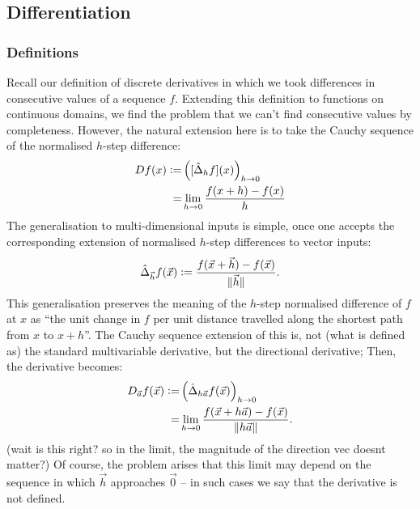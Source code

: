 \documentclass{article}
\theoremstyle{definition}
\begin{document}
\subsection{Differentiation}
\subsubsection{Definitions}
Recall our definition of discrete derivatives in which we took differences in consecutive values of a sequence $f$. Extending this definition to functions on continuous domains, we find the problem that we can't find consecutive values by completeness. However, the natural extension here is to take the Cauchy sequence of the normalised $h$-step difference:
\begin{align*}
	Df(x)\vcentcolon=&\left([\hat{\Delta}_hf](x)\right)_{h\rightarrow0}\\
	=&\lim\limits_{h\rightarrow0}\frac{f(x+h)-f(x)}{h}
\end{align*}
The generalisation to multi-dimensional inputs is simple, once one accepts the corresponding extension of normalised $h$-step differences to vector inputs:
\begin{align*}
	\hat{\Delta}_{\vec h}f(\vec x)\vcentcolon=\frac{f(\vec x+\vec h)-f(\vec x)}{\lVert\vec h\rVert}.
\end{align*}
This generalisation preserves the meaning of the $h$-step normalised difference of $f$ at $x$ as ``the unit change in $f$ per unit distance travelled along the shortest path from $x$ to $x+h$''. 
The Cauchy sequence extension of this is, not (what is defined as) the standard multivariable derivative, but the directional derivative;
Then, the derivative becomes:
\begin{align*}
	D_{\vec a}f(\vec x)\vcentcolon=&\left(\hat{\Delta}_{h\vec a}f(\vec x)\right)_{h\rightarrow0}\\
	=&\lim\limits_{h\rightarrow0}\frac{f(\vec x+h\vec a)-f(\vec x)}{\lVert h\vec a\rVert}.
\end{align*}
(wait is this right? so in the limit, the magnitude of the direction vec doesnt matter?)
Of course, the problem arises that this limit may depend on the sequence in which $\vec h$ approaches $\vec0$ -- in such cases we say that the derivative is not defined.
\end{document}
